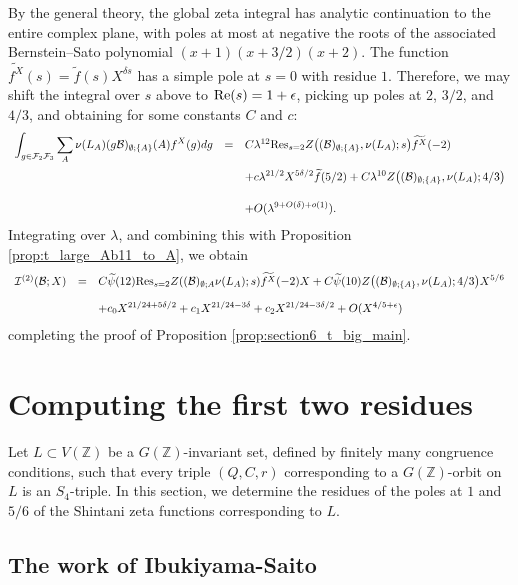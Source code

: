 \documentclass{article}
\def\Z{{\mathbb Z}}
\def\Res{{\rm Res}}
\def\Re{{\rm Re}}
\def\cB{{\mathcal B}}
\def\FF{{\mathcal F}}
\def\Z{{\mathbb Z}}
\def\I{{\mathcal I}}
\def\wt{\widetilde}
\begin{document}
By the general theory, the global zeta integral has analytic continuation to the entire complex plane, with poles at most at negative the roots of the associated Bernstein--Sato polynomial $(x+1)(x+3/2)(x+2)$. The function $\wt{f^X}(s)=\wt{f}(s)X^{\delta s}$ has a simple pole at $s=0$ with residue $1$. Therefore, we may shift the integral over $s$ above to $\Re(s)=1+\epsilon$, picking up poles at $2$, $3/2$, and $4/3$, and obtaining for some constants $C$ and $c$:
\begin{equation*}
\begin{array}{rcl}
\displaystyle\int_{g\in\FF_2\FF_3}\sum_{A}\nu(L_{A})(g\cB)_{\emptyset;\{A\}}(A)f^X(g)dg&=&C\lambda^{12}\Res_{s=2}Z\bigl((\cB)_{\emptyset;\{A\}},\nu(L_A);s\bigr)\wt{f^X}(-2)
\\[.2in]&&+\displaystyle 
c\lambda^{21/2}X^{5\delta/2}\wt{f}(5/2)+C\lambda^{10}Z\bigl((\cB)_{\emptyset;\{A\}},\nu(L_A);4/3\bigr)
\\[.2in]&&+\displaystyle 
O(\lambda^{9+O(\delta)+o(1)}).
\end{array}
\end{equation*}
Integrating over $\lambda$, and combining this with Proposition \ref{prop:t_large_Ab11_to_A}, we obtain
\begin{equation*}
\begin{array}{rcl}
\I^{(2)}(\cB;X)&=&
\displaystyle C\wt{\psi}(12)\Res_{s=2}Z((\cB)_{\emptyset;{A}}\nu(L_A);s)\wt{f^X}(-2)X+C\wt{\psi}(10)Z\bigl((\cB)_{\emptyset;\{A\}},\nu(L_A);4/3\bigr)X^{5/6}
\\[.15in]&&\displaystyle
+c_0X^{21/24+5\delta/2}+c_1X^{21/24-3\delta}+c_2X^{21/24-3\delta/2}+O(X^{4/5+\epsilon})
\end{array}
\end{equation*}
completing the proof of Proposition \ref{prop:section6_t_big_main}.



\section{Computing the first two residues}
Let $L\subset V(\Z)$ be a $G(\Z)$-invariant set, defined by finitely many congruence conditions, such that every triple $(Q,C,r)$ corresponding to a $G(\Z)$-orbit on $L$ is an $S_4$-triple. In this section, we determine the residues of the poles at $1$ and $5/6$ of the Shintani zeta functions corresponding to $L$.



\subsection{The work of Ibukiyama-Saito}
\end{document}
